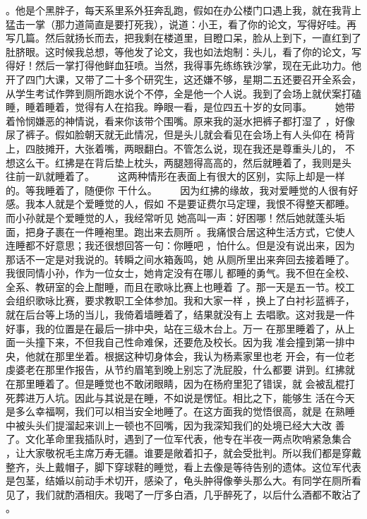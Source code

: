 。他是个黑胖子，每天系里系外狂奔乱跑，假如在办公楼门口遇上我，就在我背上 猛击一掌（那力道简直是要打死我），说道：小王，看了你的论文，写得好哇。再 写几篇。然后就扬长而去，把我剩在楼道里，目瞪口呆，脸从上到下，一直红到了 肚脐眼。这时候我总想，等他发了论文，我也如法炮制：头儿，看了你的论文，写 得好！然后一掌打得他鲜血狂喷。当然，我得事先练练铁沙掌，现在无此功力。他 开了四门大课，又带了二十多个研究生，这还嫌不够，星期二五还要召开全系会， 从学生考试作弊到厕所跑水说个不停，全是他一个人说。我到了会场上就伏案打磕 睡，睡着睡着，觉得有人在掐我。睁眼一看，是位四五十岁的女同事。 　　她带着怜悯嫌恶的神情说，看来你该带个围嘴。原来我的涎水把裤子都打湿了 ，好像尿了裤子。假如脸朝天就无此情况，但是头儿就会看见在会场上有人头仰在 椅背上，四肢摊开，大张着嘴，两眼翻白。不管怎么说，现在我还是尊重头儿的， 不想这么干。红拂是在背后垫上枕头，两腿翘得高高的，然后就睡着了，我则是头 往前一趴就睡着了。 　　这两种情形在表面上有很大的区别，实际上却是一样的。等我睡着了，随便你 干什么。 　　因为红拂的缘故，我对爱睡觉的人很有好感。我本人就是个爱睡觉的人，假如 不是要证费尔马定理，我恨不得整天都睡。而小孙就是个爱睡觉的人，我经常听见 她高叫一声：好困哪！然后她就蓬头垢面，把身子裹在一件睡袍里。跑出来去厕所 。我痛恨合居这种生活方式，它使人连睡都不好意思；我还很想回答一句：你睡吧 ，怕什么。但是没有说出来，因为那话不一定是对我说的。转瞬之间水箱轰鸣，她 从厕所里出来奔回去接着睡了。我很同情小孙，作为一位女士，她肯定没有在哪儿 都睡的勇气。我不但在全校、全系、教研室的会上酣睡，而且在歌咏比赛上也睡着 了。那一天是五一节。校工会组织歌咏比赛，要求教职工全体参加。我和大家一样 ，换上了白衬衫蓝裤子，就在后台等上场的当儿，我倚着墙睡着了，结果就没有上 去唱歌。这对我是一件好事，我的位置是在最后一排中央，站在三级木台上。万一 在那里睡着了，从上面一头撞下来，不但我自己性命难保，还要危及校长。因为我 准会撞到第一排中央，他就在那里坐着。根据这种切身体会，我认为杨素家里也老 开会，有一位老虔婆老在那里作报告，从节约眉笔到晚上别忘了洗屁股，什么都要 讲到。红拂就在那里睡着了。但是睡觉也不敢闭眼睛，因为在杨府里犯了错误，就 会被乱棍打死葬进万人坑。因此与其说是在睡，不如说是愣怔。相比之下，能够生 活在今天是多么幸福啊，我们可以相当安全地睡了。在这方面我的觉悟很高，就是 在熟睡中被头头们提溜起来训上一顿也不回嘴，因为我深知我们的处境已经大大改 善了。文化革命里我插队时，遇到了一位军代表，他专在半夜一两点吹哨紧急集合 ，让大家敬祝毛主席万寿无疆。谁要是敞着扣子，就会受批判。所以我们都是穿戴 整齐，头上戴帽子，脚下穿球鞋的睡觉，看上去像是等待告别的遗体。这位军代表 是包茎，结婚以前动手术切开，感染了，龟头肿得像拳头那么大。有同学在厕所看 见了，我们就酌酒相庆。我喝了一厅多白酒，几乎醉死了，以后什么酒都不敢沾了 。 
 
